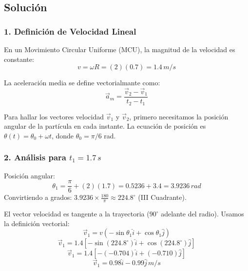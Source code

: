 \documentclass[12pt, a4paper]{article}
\begin{document}
\begin{center}
\end{center}

\subsection*{Solución}

\subsubsection*{1. Definición de Velocidad Lineal}
En un Movimiento Circular Uniforme (MCU), la magnitud de la velocidad es constante:
$$ v = \omega R = (2)(0.7) = 1.4 \, \si{m/s} $$

La aceleración media se define vectorialmante como:
$$ \vec{a}_m = \frac{\vec{v}_2 - \vec{v}_1}{t_2 - t_1} $$

Para hallar los vectores velocidad $\vec{v}_1$ y $\vec{v}_2$, primero necesitamos la posición angular de la partícula en cada instante. La ecuación de posición es $\theta(t) = \theta_0 + \omega t$, donde $\theta_0 = \pi/6$ rad.

\subsubsection*{2. Análisis para $t_1 = 1.7 \, \si{s}$}
Posición angular:
$$ \theta_1 = \frac{\pi}{6} + (2)(1.7) = 0.5236 + 3.4 = 3.9236 \, \si{rad} $$
Convirtiendo a grados: $3.9236 \times \frac{180}{\pi} \approx 224.8^\circ$ (III Cuadrante).

El vector velocidad es tangente a la trayectoria ($90^\circ$ adelante del radio). Usamos la definición vectorial:
$$ \vec{v}_1 = v (-\sin\theta_1 \hat{i} + \cos\theta_1 \hat{j}) $$
$$ \vec{v}_1 = 1.4 [-\sin(224.8^\circ)\hat{i} + \cos(224.8^\circ)\hat{j}] $$
$$ \vec{v}_1 = 1.4 [-(-0.704)\hat{i} + (-0.710)\hat{j}] $$
$$ \vec{v}_1 = 0.98\hat{i} - 0.99\hat{j} \, \si{m/s} $$
\end{document}
